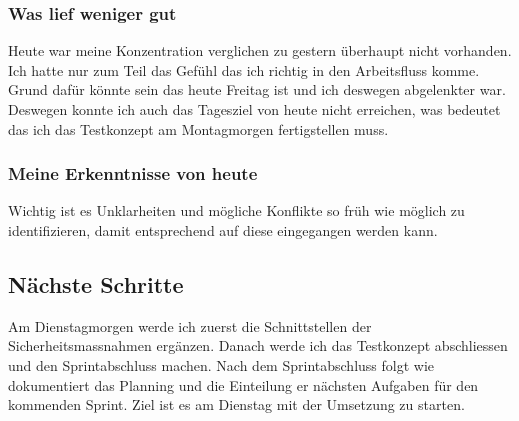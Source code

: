\subsubsection*{Was lief weniger gut}
Heute war meine Konzentration verglichen zu gestern überhaupt nicht vorhanden. Ich hatte nur zum Teil das Gefühl das ich richtig in den 
Arbeitsfluss komme. Grund dafür könnte sein das heute Freitag ist und ich deswegen abgelenkter war. Deswegen konnte ich auch das Tagesziel von heute nicht erreichen, was bedeutet
das ich das Testkonzept am Montagmorgen fertigstellen muss.

\subsubsection*{Meine Erkenntnisse von heute}
Wichtig ist es Unklarheiten und mögliche Konflikte so früh wie möglich zu identifizieren, damit entsprechend auf diese eingegangen werden kann.

\subsection*{Nächste Schritte}
Am Dienstagmorgen werde ich zuerst die Schnittstellen der Sicherheitsmassnahmen ergänzen. Danach werde ich das Testkonzept abschliessen und den 
Sprintabschluss machen. Nach dem Sprintabschluss folgt wie dokumentiert das Planning und die Einteilung er nächsten Aufgaben für den kommenden Sprint.
Ziel ist es am Dienstag mit der Umsetzung zu starten.

\pagebreak
